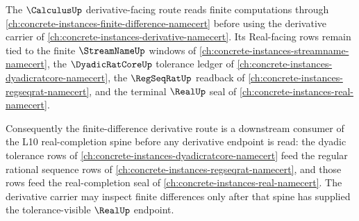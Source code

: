 The $\CalculusUp$ derivative-facing route reads finite computations through \autoref{ch:concrete-instances-finite-difference-namecert} before using the derivative carrier of \autoref{ch:concrete-instances-derivative-namecert}. Its Real-facing rows remain tied to the finite $\StreamNameUp$ windows of \autoref{ch:concrete-instances-streamname-namecert}, the $\DyadicRatCoreUp$ tolerance ledger of \autoref{ch:concrete-instances-dyadicratcore-namecert}, the $\RegSeqRatUp$ readback of \autoref{ch:concrete-instances-regseqrat-namecert}, and the terminal $\RealUp$ seal of \autoref{ch:concrete-instances-real-namecert}.

Consequently the finite-difference derivative route is a downstream consumer of the L10 real-completion spine before any derivative endpoint is read: the dyadic tolerance rows of \autoref{ch:concrete-instances-dyadicratcore-namecert} feed the regular rational sequence rows of \autoref{ch:concrete-instances-regseqrat-namecert}, and those rows feed the real-completion seal of \autoref{ch:concrete-instances-real-namecert}. The derivative carrier may inspect finite differences only after that spine has supplied the tolerance-visible $\RealUp$ endpoint.
